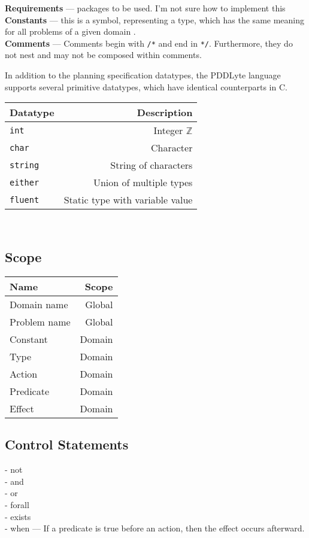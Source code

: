 \documentclass[
a4paper, %
11pt, %
onecolumn, %
openany, %
]{memoir}
\begin{document}
{\textbf{Requirements} --- packages to be used. I'm not sure how to implement this\\

\textbf{Constants} --- this is a symbol, representing a type, which has the same meaning for all problems of a given domain \cite{pddl98}.\\

\textbf{Comments} --- Comments begin with \texttt{/*} and end in \texttt{*/}. Furthermore, they do not nest and may not be composed within comments.


}

In addition to the planning specification datatypes, the PDDLyte language supports several primitive datatypes, which have identical counterparts in C. \\

\begin{tabular}{| l | r |}
\hline
Datatype    & Description \\
\hline
\texttt{int} & Integer $\mathbb{Z}$ \\
\hline
\texttt{char} & Character\\
\hline
\texttt{string} & String of characters\\
\hline
\texttt{either} & Union of multiple types\\
\hline
\texttt{fluent} & Static type with variable value \\
\hline
\end{tabular}\\


\subsection*{Scope}
\begin{tabular}{| l | r |}
\hline
Name    & Scope\\
\hline
Domain name & Global \\
Problem name & Global \\
Constant & Domain\\
Type  & Domain \\
Action  & Domain \\
Predicate & Domain \\
Effect & Domain \\
\hline
\end{tabular}

\subsection*{Control Statements}
- not\\
- and\\
- or\\
- forall\\
- exists\\
- when --- If a predicate is true before an action, then the effect occurs afterward.\\
\end{document}
